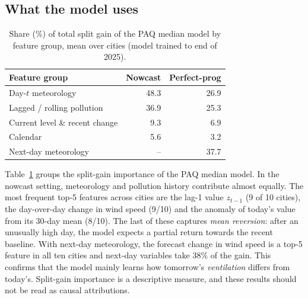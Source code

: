 \documentclass[conference]{IEEEtran}
\begin{document}
\subsection{What the model uses}
\begin{table}[t]
\centering
\caption{Share (\%) of total split gain of the PAQ median model by feature group, mean over cities (model trained to end of 2025).}
\label{tab:imp}
\begin{tabular}{lrr}
\toprule
Feature group & Nowcast & Perfect-prog \\
\midrule
Day-$t$ meteorology               & 48.3 & 26.9 \\
Lagged / rolling pollution        & 36.9 & 25.3 \\
Current level \& recent change    &  9.3 &  6.9 \\
Calendar                          &  5.6 &  3.2 \\
Next-day meteorology              &  --  & 37.7 \\
\bottomrule
\end{tabular}
\end{table}

Table~\ref{tab:imp} groups the split-gain importance of the PAQ median model. In the nowcast
setting, meteorology and pollution history contribute almost equally. The most frequent
top-5 features across cities are the lag-1 value $z_{t-1}$ (9 of 10 cities), the day-over-day change in
wind speed (9/10) and the anomaly of today's value from its 30-day mean (8/10). The last of these
captures \emph{mean reversion}: after an unusually high day, the model expects a partial return
towards the recent baseline. With next-day meteorology, the forecast change in wind speed is a top-5
feature in all ten cities and next-day variables take 38\% of the gain. This confirms that the model
mainly learns how tomorrow's \emph{ventilation} differs from today's. Split-gain importance is
a descriptive measure, and these results should not be read as causal attributions.
\end{document}
